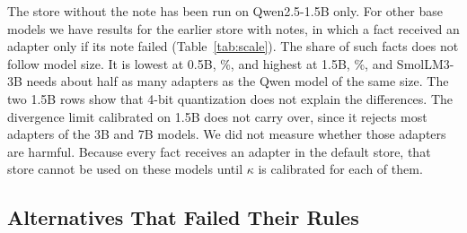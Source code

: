 \documentclass[journal,10pt]{IEEEtran}
\begin{document}
The store without the note has been run on Qwen2.5-1.5B only. For other base models we have results for the
earlier store with notes, in which a fact received an adapter only if its note failed (Table~\ref{tab:scale}).
The share of such facts does not follow model size. It is lowest at 0.5B,
\%, and highest at 1.5B,
\%, and SmolLM3-3B needs about half as many adapters as the Qwen
model of the same size. The two 1.5B rows show that 4-bit quantization does not explain the differences. The
divergence limit calibrated on 1.5B does not carry over, since it rejects most adapters of the 3B and 7B models.
We did not measure whether those adapters are harmful. Because every fact receives an adapter in the default
store, that store cannot be used on these models until $\kappa$ is calibrated for each of them.

\subsection{Alternatives That Failed Their Rules}
\label{sec:alt}
\end{document}
